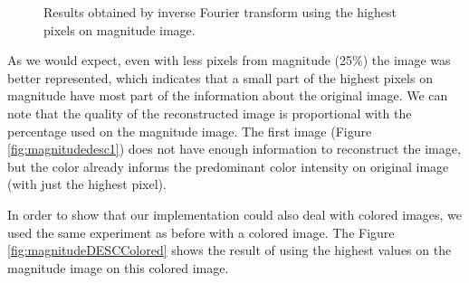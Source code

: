 \documentclass[12pt,a4paper]{article}
\begin{document}
\begin{figure}[!h]
{{		}
		\label{fig:magnitudedesc50}
	}
	\quad
	
	\caption{Results obtained by inverse Fourier transform using the highest pixels on magnitude image.}
	\label{fig:magnitudeDESC}
\end{figure}

As we would expect, even with less pixels from magnitude (25\%) the image was better represented, which indicates that a small part of the highest pixels on magnitude have most part of the information about the original image.  We can note that the quality of the reconstructed image is proportional with the percentage used on the magnitude image. The first image (Figure \ref{fig:magnitudedesc1}) does not have enough information to reconstruct the image, but the color already informs the predominant color intensity on original image (with just the highest pixel). \\
	

\newpage

In order to show that our implementation could also deal with colored images, we used the same experiment as before with a colored image. The Figure \ref{fig:magnitudeDESCColored} shows the result of using the highest values on the magnitude image on this colored image. \\
\end{document}

